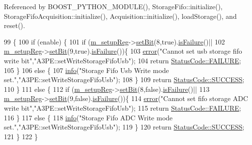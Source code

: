 Referenced by B\+O\+O\+S\+T\+\_\+\+P\+Y\+T\+H\+O\+N\+\_\+\+M\+O\+D\+U\+L\+E(), Storage\+Fifo\+::initialize(), Storage\+Fifo\+Acquisition\+::initialize(), Acquisition\+::initialize(), load\+Storage(), and reset().


\begin{DoxyCode}
99                                                   \{
100   \textcolor{keywordflow}{if} (enable) \{
101     \textcolor{keywordflow}{if} (\hyperlink{classA3PE_a142fa10b7e705c4701ae21678ec2ec8a}{m\_setupReg}->\hyperlink{classRegister_ab094246dd12aa7e0aa0ca917f4e70b31}{setBit}(8,\textcolor{keyword}{true}).\hyperlink{classStatusCode_a5dd22dc6eb2c52fc4cabc58f6dea2eb7}{isFailure}()||
102         \hyperlink{classA3PE_a142fa10b7e705c4701ae21678ec2ec8a}{m\_setupReg}->\hyperlink{classRegister_ab094246dd12aa7e0aa0ca917f4e70b31}{setBit}(9,\textcolor{keyword}{true}).\hyperlink{classStatusCode_a5dd22dc6eb2c52fc4cabc58f6dea2eb7}{isFailure}())\{
103       \hyperlink{classObject_a204a95f57818c0f811933917a30eff45}{error}(\textcolor{stringliteral}{"Cannot set usb storage fifo write bit"},\textcolor{stringliteral}{"A3PE::setWriteStorageFifoUsb"});
104       \textcolor{keywordflow}{return} \hyperlink{classStatusCode_a6f565cbeadc76d14c72f047e5e85eb4ba3da73d4c469762eb9d3c960368252b26}{StatusCode::FAILURE};
105     \}
106     \textcolor{keywordflow}{else} \{
107       \hyperlink{classObject_a644fd329ea4cb85f54fa6846484b84a8}{info}(\textcolor{stringliteral}{"Storage Fifo Usb Write mode set."},\textcolor{stringliteral}{"A3PE::setWriteStorageFifoUsb"});
108     \}
109     \textcolor{keywordflow}{return} \hyperlink{classStatusCode_a6f565cbeadc76d14c72f047e5e85eb4badd0da38d3ba0d922efd1f4619bc37ad8}{StatusCode::SUCCESS};
110   \}
111   \textcolor{keywordflow}{else} \{
112     \textcolor{keywordflow}{if} (\hyperlink{classA3PE_a142fa10b7e705c4701ae21678ec2ec8a}{m\_setupReg}->\hyperlink{classRegister_ab094246dd12aa7e0aa0ca917f4e70b31}{setBit}(8,\textcolor{keyword}{false}).\hyperlink{classStatusCode_a5dd22dc6eb2c52fc4cabc58f6dea2eb7}{isFailure}()||
113         \hyperlink{classA3PE_a142fa10b7e705c4701ae21678ec2ec8a}{m\_setupReg}->\hyperlink{classRegister_ab094246dd12aa7e0aa0ca917f4e70b31}{setBit}(9,\textcolor{keyword}{false}).\hyperlink{classStatusCode_a5dd22dc6eb2c52fc4cabc58f6dea2eb7}{isFailure}())\{
114       \hyperlink{classObject_a204a95f57818c0f811933917a30eff45}{error}(\textcolor{stringliteral}{"Cannot set fifo storage ADC write bit"},\textcolor{stringliteral}{"A3PE::setWriteStorageFifoUsb"});
115       \textcolor{keywordflow}{return} \hyperlink{classStatusCode_a6f565cbeadc76d14c72f047e5e85eb4ba3da73d4c469762eb9d3c960368252b26}{StatusCode::FAILURE};
116     \}
117     \textcolor{keywordflow}{else} \{
118       \hyperlink{classObject_a644fd329ea4cb85f54fa6846484b84a8}{info}(\textcolor{stringliteral}{"Storage Fifo ADC Write mode set."},\textcolor{stringliteral}{"A3PE::setWriteStorageFifoUsb"});
119     \}
120     \textcolor{keywordflow}{return} \hyperlink{classStatusCode_a6f565cbeadc76d14c72f047e5e85eb4badd0da38d3ba0d922efd1f4619bc37ad8}{StatusCode::SUCCESS};
121   \}
122 \}
\end{DoxyCode}

